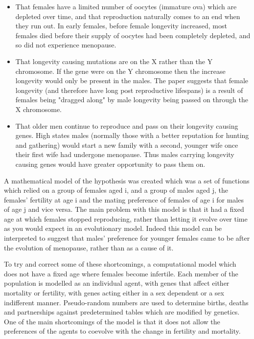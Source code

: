 \documentclass[authoryearcitations]{UoYCSproject}
\begin{document}
\begin{itemize}
\item That females have a limited number of oocytes (immature ova) which are depleted over time, and that reproduction naturally comes to an end when they run out. \cite{humanPopBio1994} In early females, before female longevity increased, most females died before their supply of oocytes had been completely depleted, and so did not experience menopause.
\item That longevity causing mutations are on the X rather than the Y chromosome. If the gene were on the Y chromosome then the increase longevity would only be present in the males. The paper suggests that female longevity (and therefore have long post reproductive lifespans) is a result of females being "dragged along" by male longevity being passed on through the X chromosome. 
\item That older men continue to reproduce and pass on their longevity causing genes. High states males (normally those with a better reputation for hunting and gathering) would start a new family with a second, younger wife once their first wife had undergone menopause. Thus males carrying longevity causing genes would have greater opportunity to pass them on.
\end{itemize}

A mathematical model of the hypothesis was created \cite{whyMenMatter2007} which was a set of functions which relied on a group of females aged i, and a group of males aged j, the females' fertility at age i and the mating preference of females of age i for males of age j and vice versa. The main problem with this model is that it had a fixed age at which females stopped reproducing, rather than letting it evolve over time as you would expect in an evolutionary model. Indeed this model can be interpreted to suggest that males' preference for younger females came to be after the evolution of menopause, rather than as a cause of it.

To try and correct some of these shortcomings, a computational model \cite{mateChoice2013} which does not have a fixed age where females become infertile. Each member of the population is modelled as an individual agent, with genes that affect either mortality or fertility, with genes acting either in a sex dependent or a sex indifferent manner. Pseudo-random numbers are used to determine births, deaths and partnerships against predetermined tables which are modified by genetics. One of the main shortcomings of the model is that it does not allow the preferences of the agents to coevolve with the change in fertility and mortality. 
\end{document}

